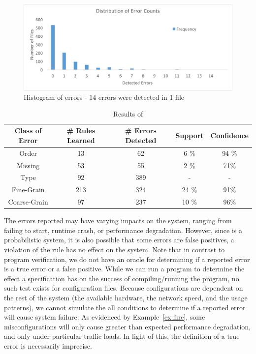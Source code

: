 \begin{figure}[h]
\includegraphics[width=\textwidth]{figs/histogram.png}
\caption{Histogram of errors - 14 errors were detected in 1 file}
\label{fig:histo}
\end{figure}

\begin{table}[h]
\centering
\caption{Results of \app}
\label{table:learning}
\setlength{\tabcolsep}{0.5em}
\begin{tabular}{|c|c|c|c|c|}
\hline
{\bf Class of Error } & {\bf \# Rules Learned} & {\bf \# Errors Detected} & {\bf Support} & {\bf Confidence}\\ 
\hline
\hline
Order        & 13  & 62   & 6 \% & 94 \% \\ 
Missing      & 53  & 55   & 2 \%  & 71\% \\ 
Type         & 92  & 389  & -  & -  \\ 
Fine-Grain   & 213 & 324  & 24 \% & 91\%  \\ 
Coarse-Grain & 97  & 237  & 10 \% & 96\% \\ 
\hline 
\end{tabular}
\end{table}

The errors reported may have varying impacts on the system, ranging from failing to start, runtime crash, or performance degradation.
However, since \app is a probabilistic system, it is also possible that some errors are false positives, a violation of the rule has no effect on the system.
Note that in contrast to program verification, we do not have an oracle for determining if a reported error is a true error or a false positive.
While we can run a program to determine the effect a specification has on the success of compiling/running the program, no such test exists for configuration files.
Because configurations are dependent on the rest of the system (\ie the available hardware, the network speed, and the usage patterns), we cannot simulate the all conditions to determine if a reported error will cause system failure.
As evidenced by Example~\ref{ex:fine}, some misconfigurations will only cause greater than expected performance degradation, and only under particular traffic loads.
In light of this, the definition of a true error is necessarily imprecise.

